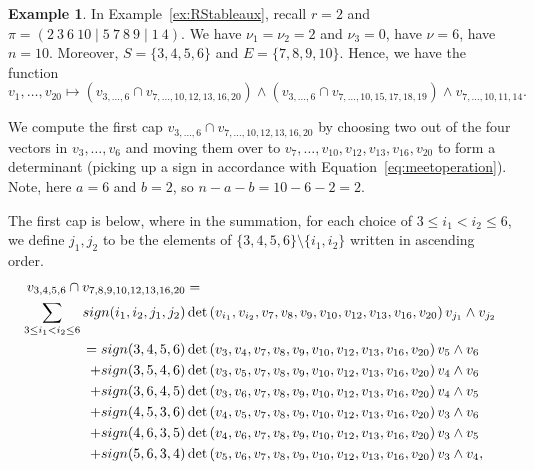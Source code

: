 \documentclass[10pt]{amsart}
\theoremstyle{definition}
\theoremstyle{plain}
\theoremstyle{plain}
\theoremstyle{definition}
\newtheorem{example}[cdrthm]{Example}
\theoremstyle{remark}
\theoremstyle{plain}
\theoremstyle{plain}
\theoremstyle{plain}
\numberwithin{equation}{section}
\begin{document}
\begin{example}\label{ex:cap}
In Example~\ref{ex:RStableaux}, recall $r=2$ and $\pi=(2~3~6~10 \mid 5~7~8~9 \mid 1~4)$. We have $\nu_1 = \nu_2 = 2$ and $\nu_3 = 0$, have $\nu = 6$, have $n=10$. Moreover, $S = \{3,4,5,6\}$ and $E = \{7,8,9,10\}$.
Hence, we have the function 
\[v_1,\dots,v_{20} \mapsto \left(v_{3,\dots,6} \cap v_{7,\dots,10, 12, 13, 16, 20} \right) \wedge \left(v_{3,\dots,6} \cap v_{7,\dots,10, 15, 17, 18, 19} \right) \wedge v_{7,\dots,10, 11, 14}.\]

We compute the first cap $v_{3,\dots,6} \cap v_{7,\dots,10, 12, 13, 16, 20}$ by choosing two out of the four vectors in $v_{3},\dots,v_{6}$ and moving them over to $v_7,\dots,v_{10},v_{12},v_{13},v_{16},v_{20}$ to form a determinant (picking up a sign in accordance with Equation~\eqref{eq:meetoperation}). Note, here $a=6$ and $b=2$, so $n -a-b = 10-6-2 = 2$.

The first cap is below, where in the summation, for each choice of $3 \leq i_1 < i_2 \leq 6$, we define $j_1,j_{2}$ to be the elements of $\{3,4,5,6\} \setminus \{i_1,i_2\}$ written in ascending order. 
\begin{align*}
v_{3,4,5,6} \cap v_{7,8,9,10,12,13,16,20} &= \\ \sum_{3\leq i_1 < i_2\leq 6} {\rm sign}(i_1,i_2,j_1,j_{2}) &\det\left(v_{i_1},v_{i_2}, v_{7}, v_{8}, v_{9}, v_{10},v_{12}, v_{13}, v_{16}, v_{20}\right)v_{j_1} \wedge v_{j_{2}}\nonumber \\
= {\rm sign}(3,4,5,6) &\det\left(v_{3},v_{4}, v_{7}, v_{8}, v_{9}, v_{10},v_{12}, v_{13}, v_{16}, v_{20}\right)v_{5} \wedge v_{6} \nonumber \\
+ {\rm sign}(3,5,4,6) &\det\left(v_{3},v_{5}, v_{7}, v_{8}, v_{9}, v_{10},v_{12}, v_{13}, v_{16}, v_{20}\right)v_{4} \wedge v_{6} \nonumber \\
+ {\rm sign}(3,6,4,5) &\det\left(v_{3},v_{6}, v_{7}, v_{8}, v_{9}, v_{10},v_{12}, v_{13}, v_{16}, v_{20}\right)v_{4} \wedge v_{5} \nonumber \\
+ {\rm sign}(4,5,3,6) &\det\left(v_{4},v_{5}, v_{7}, v_{8}, v_{9}, v_{10},v_{12}, v_{13}, v_{16}, v_{20}\right)v_{3} \wedge v_{6} \nonumber \\
+ {\rm sign}(4,6,3,5) &\det\left(v_{4},v_{6}, v_{7}, v_{8}, v_{9}, v_{10},v_{12}, v_{13}, v_{16}, v_{20}\right)v_{3} \wedge v_{5} \nonumber \\
+ {\rm sign}(5,6,3,4) &\det\left(v_{5},v_{6}, v_{7}, v_{8}, v_{9}, v_{10},v_{12}, v_{13}, v_{16}, v_{20}\right)v_{3} \wedge v_{4} \nonumber ,
\end{align*}



\end{example}
\end{document}

